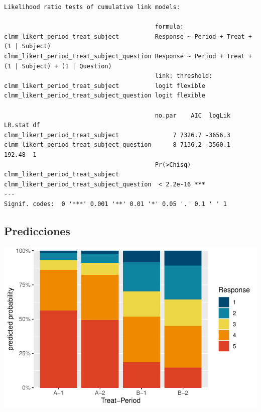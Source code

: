 \documentclass[
  letterpaper,
  DIV=11,
  numbers=noendperiod]{scrartcl}
\begin{document}
\begin{verbatim}
Likelihood ratio tests of cumulative link models:
 
                                          formula:                                                  
clmm_likert_period_treat_subject          Response ~ Period + Treat + (1 | Subject)                 
clmm_likert_period_treat_subject_question Response ~ Period + Treat + (1 | Subject) + (1 | Question)
                                          link: threshold:
clmm_likert_period_treat_subject          logit flexible  
clmm_likert_period_treat_subject_question logit flexible  

                                          no.par    AIC  logLik LR.stat df
clmm_likert_period_treat_subject               7 7326.7 -3656.3           
clmm_likert_period_treat_subject_question      8 7136.2 -3560.1  192.48  1
                                          Pr(>Chisq)    
clmm_likert_period_treat_subject                        
clmm_likert_period_treat_subject_question  < 2.2e-16 ***
---
Signif. codes:  0 '***' 0.001 '**' 0.01 '*' 0.05 '.' 0.1 ' ' 1
\end{verbatim}

\hypertarget{predicciones}{%
\subsection{Predicciones}\label{predicciones}}

\includegraphics{ordinal_files/figure-pdf/unnamed-chunk-24-1.pdf}
\end{document}
